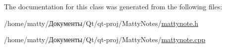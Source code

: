 The documentation for this class was generated from the following files\+:\begin{DoxyCompactItemize}
\item 
/home/matty/Документы/\+Qt/qt-\/proj/\+Matty\+Notes/\hyperlink{mattynote_8h}{mattynote.\+h}\item 
/home/matty/Документы/\+Qt/qt-\/proj/\+Matty\+Notes/\hyperlink{mattynote_8cpp}{mattynote.\+cpp}\end{DoxyCompactItemize}
